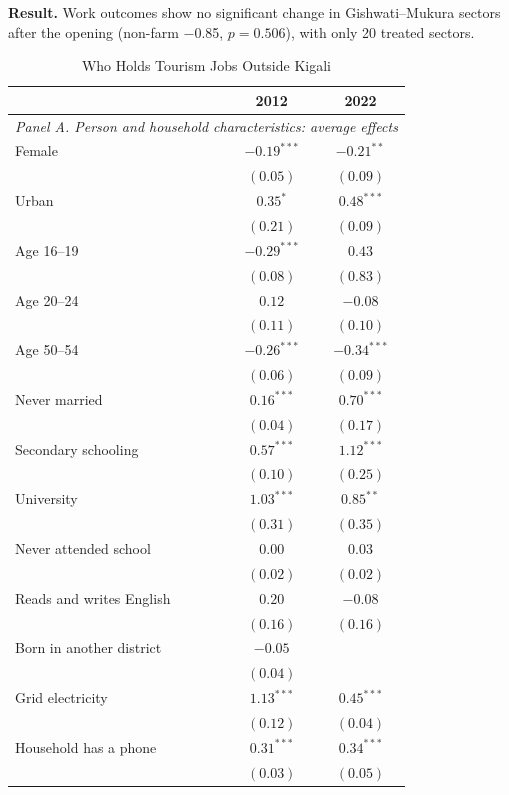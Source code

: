\documentclass[11pt]{article}
\begin{document}
\textbf{Result.} Work outcomes show no significant change in Gishwati--Mukura sectors after the opening (non-farm $-$0.85, $p=0.506$), with only 20 treated sectors.
\clearpage
\begin{table}[H]
\centering\scriptsize\setlength{\tabcolsep}{4pt}\renewcommand{\arraystretch}{0.75}
\caption{Who Holds Tourism Jobs Outside Kigali}
\label{tab:tourism_jobs_lasso}
\begin{tabular}{lcc}
\toprule
 & 2012 & 2022 \\
\midrule
\multicolumn{3}{l}{\textit{Panel A. Person and household characteristics: average effects}} \\
Female & $-0.19^{***}$ & $-0.21^{**}$ \\
 & $(0.05)$ & $(0.09)$ \\
Urban & $0.35^{*}$ & $0.48^{***}$ \\
 & $(0.21)$ & $(0.09)$ \\
Age 16--19 & $-0.29^{***}$ & $0.43$ \\
 & $(0.08)$ & $(0.83)$ \\
Age 20--24 & $0.12$ & $-0.08$ \\
 & $(0.11)$ & $(0.10)$ \\
Age 50--54 & $-0.26^{***}$ & $-0.34^{***}$ \\
 & $(0.06)$ & $(0.09)$ \\
Never married & $0.16^{***}$ & $0.70^{***}$ \\
 & $(0.04)$ & $(0.17)$ \\
Secondary schooling & $0.57^{***}$ & $1.12^{***}$ \\
 & $(0.10)$ & $(0.25)$ \\
University & $1.03^{***}$ & $0.85^{**}$ \\
 & $(0.31)$ & $(0.35)$ \\
Never attended school & $0.00$ & $0.03$ \\
 & $(0.02)$ & $(0.02)$ \\
Reads and writes English & $0.20$ & $-0.08$ \\
 & $(0.16)$ & $(0.16)$ \\
Born in another district & $-0.05$ &  \\
 & $(0.04)$ &  \\
Grid electricity & $1.13^{***}$ & $0.45^{***}$ \\
 & $(0.12)$ & $(0.04)$ \\
Household has a phone & $0.31^{***}$ & $0.34^{***}$ \\
 & $(0.03)$ & $(0.05)$ \\

\end{tabular}
\end{table}
\end{document}
